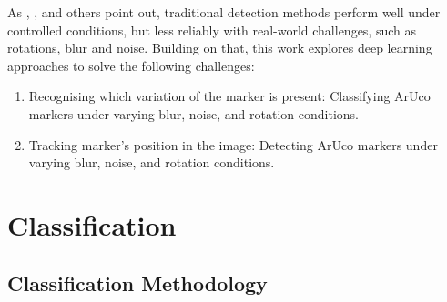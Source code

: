 \documentclass[conference]{IEEEtran}
\begin{document}
As \textcite{FiducialMarkerNoisy}, \textcite{ROMERORAMIREZ2021104094}, and others point out, traditional detection methods perform well under controlled 
conditions, but less reliably with real-world challenges, such as rotations, blur and noise. Building on that, this work explores deep learning 
approaches to solve the following challenges:

\begin{enumerate}
  \item Recognising which variation of the marker is present: Classifying ArUco markers under varying blur, noise, and rotation conditions. 
  \item Tracking marker's position in the image: Detecting ArUco markers under varying blur, noise, and rotation conditions. 
\end{enumerate}

\section{Classification}

\subsection{Classification Methodology}
\end{document}
